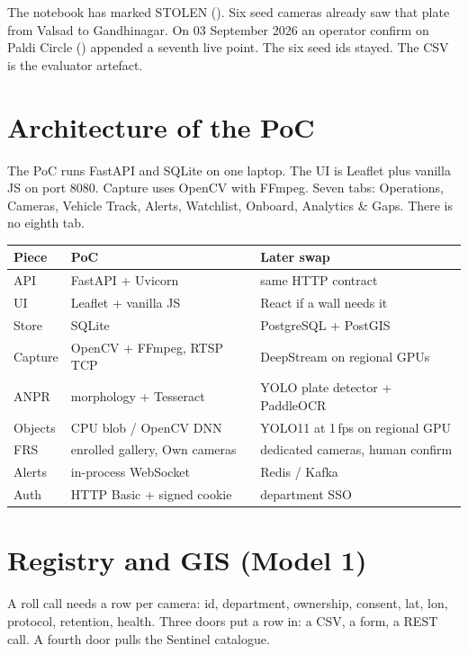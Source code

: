 \documentclass[listings]{csf301-notes}
\begin{document}
\begin{example}
The notebook has  marked STOLEN (). Six seed cameras already saw that plate from Valsad to Gandhinagar. On 03 September 2026 an operator confirm on Paldi Circle () appended a seventh live point. The six seed ids stayed. The CSV is the evaluator artefact.
\end{example}

\section{Architecture of the PoC}
\begin{center}\resizebox{0.98\textwidth}{!}{}\end{center}

The PoC runs FastAPI and SQLite on one laptop. The UI is Leaflet plus vanilla JS on port 8080. Capture uses OpenCV with FFmpeg. Seven tabs: Operations, Cameras, Vehicle Track, Alerts, Watchlist, Onboard, Analytics \& Gaps. There is no eighth tab.

\begin{langbox}
\begin{tabular}{@{}lll@{}}
\toprule
Piece & PoC & Later swap \\
\midrule
API & FastAPI + Uvicorn & same HTTP contract \\
UI & Leaflet + vanilla JS & React if a wall needs it \\
Store & SQLite & PostgreSQL + PostGIS \\
Capture & OpenCV + FFmpeg, RTSP TCP & DeepStream on regional GPUs \\
ANPR & morphology + Tesseract & YOLO plate detector + PaddleOCR \\
Objects & CPU blob / OpenCV DNN & YOLO11 at 1\,fps on regional GPU \\
FRS & enrolled gallery, Own cameras & dedicated cameras, human confirm \\
Alerts & in-process WebSocket & Redis / Kafka \\
Auth & HTTP Basic + signed cookie & department SSO \\
\bottomrule
\end{tabular}
\end{langbox}

\section{Registry and GIS (Model 1)}
A roll call needs a row per camera: id, department, ownership, consent, lat, lon, protocol, retention, health. Three doors put a row in: a CSV, a form, a REST call. A fourth door pulls the Sentinel catalogue.
\end{document}

